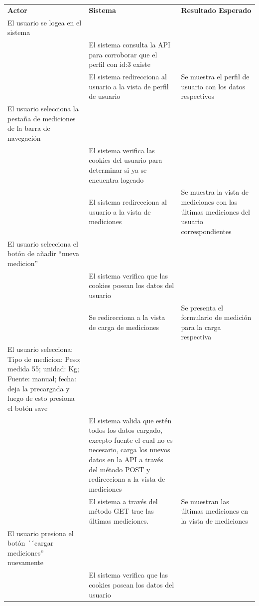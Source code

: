 	\begin{longtable}{|p{5cm}|p{5cm}|p{4cm}|}
 
	    \hline \hline \rowcolor[gray]{0.9}
        \multicolumn{3}{||l|}{\textbf{Procedimiento de Prueba - Consultar mediciones}} \\ \hline
	    \hline 
        \rowcolor[gray]{0.9}
	    \textbf{Actor} & \textbf{Sistema}& \textbf{Resultado Esperado} \\  \hline
	    El usuario se logea en el sistema& & \\ \hline
        & El sistema consulta la API para corroborar que el perfil con id:3 existe &\\ \hline
        &  El sistema redirecciona al usuario a la vista de perfil de usuario&Se muestra el perfil de usuario con los datos respectivos\\ \hline
	    El usuario selecciona la pestaña de mediciones de la barra de navegación& &\\ \hline
        & El sistema verifica las cookies del usuario para determinar si ya se encuentra logeado &\\ \hline
        & El sistema redirecciona al usuario a la vista de mediciones&Se muestra la vista de mediciones con las últimas mediciones del usuario correspondientes\\ \hline  
        El usuario selecciona el botón de añadir ``nueva medicion''& &\\ \hline       
        & El sistema verifica que las cookies posean los datos del usuario&\\ \hline       
        & Se redirecciona a la vista de carga de mediciones&Se presenta el formulario de medición para la carga respectiva\\ \hline
        El usuario selecciona: Tipo de medicion: Peso; medida 55; unidad: Kg; Fuente: manual; fecha: deja la precargada y  luego de esto presiona el botón save& &\\ \hline       
        & El sistema valida que estén todos los datos cargado, excepto fuente el cual no es necesario, carga los nuevos datos en la API a través del método POST y redirecciona a la vista de mediciones&\\ \hline       
        &El sistema a través del método GET trae las últimas mediciones. &Se muestran las últimas mediciones en la vista de mediciones\\ \hline
        El usuario presiona el botón ´´cargar mediciones'' nuevamente& &\\ \hline  
        & El sistema verifica que las cookies posean los datos del usuario&\\ \hline       

\end{longtable}
